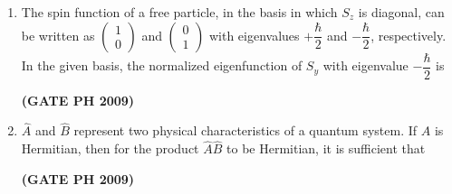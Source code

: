 \documentclass[14pt, a4paper]{extarticle}
\begin{document}
\begin{enumerate}[label=\textbf{Q. \arabic*}, start=21]
\item The spin function of a free particle, in the basis in which $S_z$ is diagonal, can be written as
$\begin{pmatrix} 1 \\ 0 \end{pmatrix}$ and $\begin{pmatrix} 0 \\ 1 \end{pmatrix}$ with eigenvalues $+\dfrac{\hbar}{2}$ and $-\dfrac{\hbar}{2}$, respectively. In the given basis, the normalized eigenfunction of $S_y$ with eigenvalue $-\dfrac{\hbar}{2}$ is
\begin{enumerate}
\end{enumerate}
\hfill \textbf{(GATE PH 2009)}

\item $\hat{A}$ and $\hat{B}$ represent two physical characteristics of a quantum system. If $\hat{A}$ is Hermitian, then for the product $\hat{A}\hat{B}$ to be Hermitian, it is sufficient that
\begin{enumerate}
\end{enumerate}
\hfill \textbf{(GATE PH 2009)}


\end{enumerate}
\end{document}
